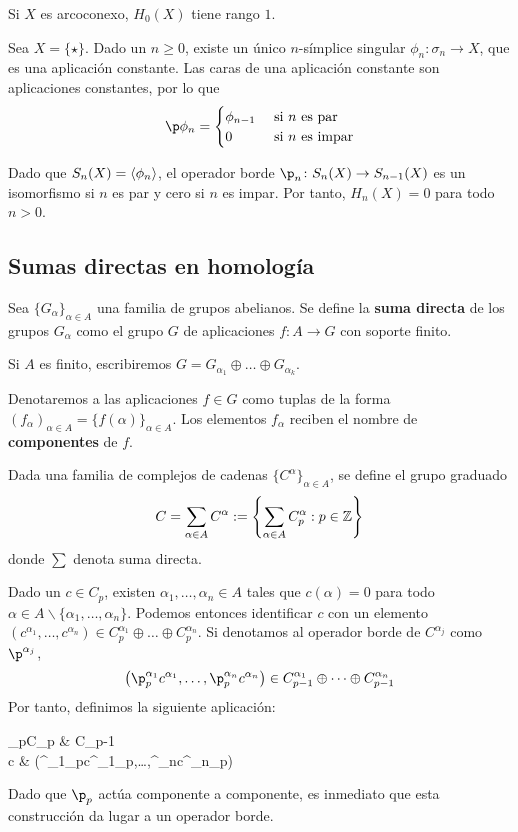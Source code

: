 \begin{proposition}
	Si $X$ es arcoconexo, $H_0(X)$ tiene rango $1$.
\end{proposition}

\begin{example}
	Sea $X=\{\star\}$.
	Dado un $n \geq 0$, existe un único $n$-símplice singular $\phi_n\colon\sigma_n \to X$, que es una aplicación constante.
	Las caras de una aplicación constante son aplicaciones constantes, por lo que
	\begin{align*}
	\p\phi_n=
		\begin{cases}
		\phi_{n-1}	&\mbox{ si }n\mbox{ es par}\\
		0          	&\mbox{ si }n\mbox{ es impar}
		\end{cases}
	\end{align*}

	Dado que $S_n(X)=\left\langle \phi_n\right\rangle$, el operador borde $\p_n\colon S_n(X) \to S_{n-1}(X)$ es un isomorfismo si $n$ es par y cero si $n$ es impar.
	Por tanto, $H_n(X)=0$ para todo $n > 0$.
\end{example}

\subsection{Sumas directas en homología}
\begin{definition}
	Sea $\{G_\alpha\}_{\alpha \in A}$ una familia de grupos abelianos.
	Se define la \textbf{suma directa} de los grupos $G_\alpha$ como el grupo $G$ de aplicaciones $f\colon A \to G$ con soporte finito.

	Si $A$ es finito, escribiremos $G=G_{\alpha_1}\oplus \dots \oplus G_{\alpha_k}$.
\end{definition}

Denotaremos a las aplicaciones $f \in G$ como tuplas de la forma $(f_\alpha)_{\alpha \in A}=\{f(\alpha)\}_{\alpha \in A}$.
Los elementos $f_\alpha$ reciben el nombre de \textbf{componentes} de $f$.

Dada una familia de complejos de cadenas $\{C^\alpha\}_{\alpha \in A}$, se define el grupo graduado
	\[C=\sum_{\alpha \in A}C^\alpha:=\left\{\sum_{\alpha \in A}C^\alpha_p: p \in \mathbb{Z}\right\}\]
donde $\sum$ denota suma directa.

Dado un $c \in C_p$, existen $\alpha_1,\dots,\alpha_n \in A$ tales que $c(\alpha)=0$ para todo $\alpha \in A\backslash \{\alpha_1,\dots,\alpha_n\}$.
Podemos entonces identificar $c$ con un elemento $(c^{\alpha_1},\dots,c^{\alpha_n}) \in C^{\alpha_1}_p\oplus\dots\oplus C^{\alpha_n}_p$.
Si denotamos al operador borde de $C^{\alpha_j}$ como $\p^{\alpha_j}$,
	\[\left(\p^{\alpha_1}_pc^{\alpha_1},\dots,\p^{\alpha_n}_pc^{\alpha_n}\right) \in C^{\alpha_1}_{p-1}\oplus\dots\oplus C^{\alpha_n}_{p-1}\]
Por tanto, definimos la siguiente aplicación:
	\begin{funcion*}
	\p_p\colon C_p \arrow[r]             & C_{p-1}                   \\
	c \arrow[r, maps to] &
	(\p^{\alpha_1}_pc^{\alpha_1}_p,\dots,\p^{\alpha_n}c^{\alpha_n}_p)
	\end{funcion*}
Dado que $\p_p$ actúa componente a componente, es inmediato que esta construcción da lugar a un operador borde.

